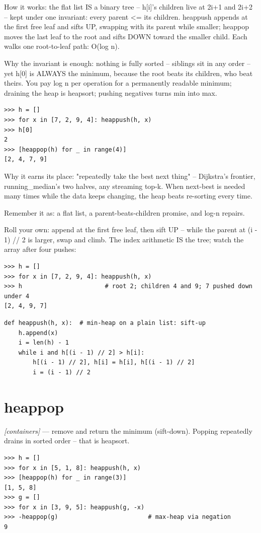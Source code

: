 \documentclass[11pt,letterpaper]{book}
\begin{document}
How it works: the flat list IS a binary tree -- h[i]'s children live at 2i+1 and 2i+2 -- kept under one invariant: every parent <= its children. heappush appends at the first free leaf and sifts UP, swapping with its parent while smaller; heappop moves the last leaf to the root and sifts DOWN toward the smaller child. Each walks one root-to-leaf path: O(log n).


Why the invariant is enough: nothing is fully sorted -- siblings sit in any order -- yet h[0] is ALWAYS the minimum, because the root beats its children, who beat theirs. You pay log n per operation for a permanently readable minimum; draining the heap is heapsort; pushing negatives turns min into max.

\begin{lstlisting}[style=spec]
>>> h = []
>>> for x in [7, 2, 9, 4]: heappush(h, x)
>>> h[0]
2
>>> [heappop(h) for _ in range(4)]
[2, 4, 7, 9]
\end{lstlisting}

Why it earns its place: "repeatedly take the best next thing" -- Dijkstra's frontier, running\_median's two halves, any streaming top-k. When next-best is needed many times while the data keeps changing, the heap beats re-sorting every time.


Remember it as: a flat list, a parent-beats-children promise, and log-n repairs.


Roll your own: append at the first free leaf, then sift UP -- while the parent at (i - 1) // 2 is larger, swap and climb. The index arithmetic IS the tree; watch the array after four pushes:

\begin{lstlisting}[style=spec]
>>> h = []
>>> for x in [7, 2, 9, 4]: heappush(h, x)
>>> h                       # root 2; children 4 and 9; 7 pushed down under 4
[2, 4, 9, 7]
\end{lstlisting}
\begin{lstlisting}[style=code]
def heappush(h, x):  # min-heap on a plain list: sift-up
    h.append(x)
    i = len(h) - 1
    while i and h[(i - 1) // 2] > h[i]:
        h[(i - 1) // 2], h[i] = h[i], h[(i - 1) // 2]
        i = (i - 1) // 2
\end{lstlisting}

\section{heappop}
\noindent\textit{[containers]} --- remove and return the minimum (sift-down). Popping repeatedly drains in sorted order -- that is heapsort.
\begin{lstlisting}[style=spec]
>>> h = []
>>> for x in [5, 1, 8]: heappush(h, x)
>>> [heappop(h) for _ in range(3)]
[1, 5, 8]
>>> g = []
>>> for x in [3, 9, 5]: heappush(g, -x)
>>> -heappop(g)                         # max-heap via negation
9
\end{lstlisting}
\end{document}
